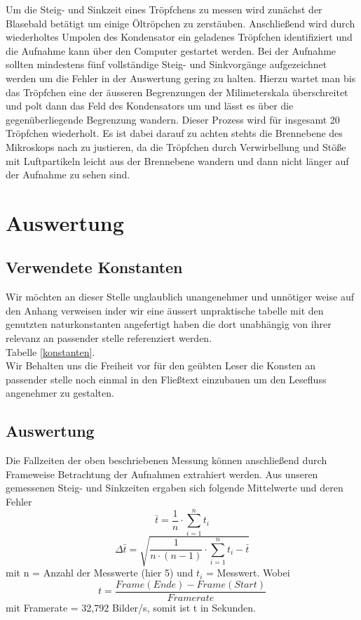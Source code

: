 \documentclass{scrartcl}
\begin{document}
		Um die Steig- und Sinkzeit eines Tröpfchens zu messen wird zunächst der Blasebald betätigt um einige
		Öltröpchen zu zerstäuben. Anschließend wird durch wiederholtes Umpolen des Kondensator ein geladenes Tröpfchen 
		identifiziert und die Aufnahme kann über den Computer gestartet werden. Bei der Aufnahme sollten mindestens fünf
		vollständige Steig- und Sinkvorgänge aufgezeichnet werden um die Fehler in der Auswertung gering zu halten.
		Hierzu wartet man bis das Tröpfchen eine der äusseren Begrenzungen der Milimeterskala überschreitet und polt dann
		das Feld des Kondensators um und lässt es über die gegenüberliegende Begrenzung wandern.
		Dieser Prozess wird für insgesamt 20 Tröpfchen wiederholt. Es ist dabei darauf zu achten stehts
		die Brennebene des Mikroskops nach zu justieren, da die Tröpfchen durch Verwirbellung und Stöße mit 
		Luftpartikeln leicht aus der Brennebene wandern und dann nicht länger auf der Aufnahme zu sehen sind.

        \section{Auswertung}
            \subsection*{Verwendete Konstanten}
                Wir möchten an dieser Stelle unglaublich unangenehmer und unnötiger weise auf den Anhang verweisen inder wir
                eine äussert unpraktische tabelle mit den genutzten naturkonstanten angefertigt haben die dort unabhängig von
                ihrer relevanz an passender stelle referenziert werden.\\
                Tabelle \ref{konstanten}.\\
                Wir Behalten uns die Freiheit vor für den geübten Leser die Konsten an passender stelle noch einmal
                in den Fließtext einzubauen um den Lesefluss angenehmer zu gestalten.
            \subsection*{Auswertung}
            Die Fallzeiten der oben beschriebenen Messung können anschließend durch Frameweise Betrachtung der Aufnahmen
            extrahiert werden.
            Aus unseren gemessenen Steig- und Sinkzeiten ergaben sich folgende Mittelwerte und deren Fehler
            \begin{equation}
                \bar{t} = \frac{1}{n} \cdot \sum_{i=1}^n t_i
            \end{equation}
            \begin{equation}
                \Delta \bar{t} = \sqrt{\frac{1}{n\cdot(n-1)}\cdot \sum_{i=1}^n{t_i - \bar{t}}}
            \end{equation}
            mit n = Anzahl der Messwerte (hier 5) und $t_i$ = Messwert.
            Wobei 
            \begin{equation}
                t = \frac{Frame(Ende)-Frame(Start)}{Framerate}
            \end{equation}
            mit Framerate = 32,792 Bilder/s, somit ist t in Sekunden.
\end{document}
